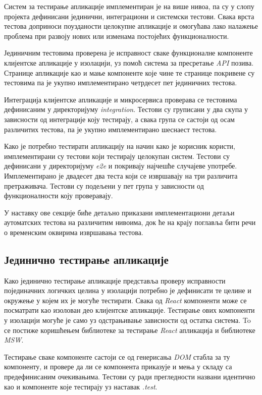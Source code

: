 \documentclass[12pt,oneside]{memoir}
\begin{document}
Систем за тестирање апликације имплементиран је на више нивоа, па су у слопу пројекта дефинисани јединични, интеграциони и системски тестови. Свака врста тестова доприноси поузданости целокупне апликације и омогућава лако налажење проблема при развоју нових или изменама постојећих функционалности.

Јединичним тестовима проверена је исправност сваке функционалне компоненте клијентске апликације у изолацији, уз помоћ система за пресретање \textit{API} позива. Странице апликације као и мање компоненте које чине те странице покривене су тестовима па је укупно имплементирано четрдесет пет јединичних тестова.

Интеграција клијентске апликације и микросервиса проверава се тестовима дефинисаним у директоријуму \textit{integration}. Тестови су груписани у два скупа у зависности од интеграције коју тестирају, а свака група се састоји од осам различитих тестова, па је укупно имплементирано шеснаест тестова.

Како је потребно тестирати апликацију на начин како је корисник користи, имплементирани су тестови који тестирају целокупан систем. Тестови су дефинисани у директоријуму \textit{e2e} и покривају најчешће случајеве употребе. Имплементирано је двадесет два теста који се извршавају на три различита претраживача.  Тестови су подељени у пет група у зависности од функционалности коју проверавају.

У наставку ове секције биће детаљно приказани имплементациони детаљи аутоматских тестова на различитим нивоима, док ће на крају поглавља бити речи о временским оквирима извршавања тестова.

\subsection{Јединично тестирање апликације}

Како јединично тестирање апликације представља проверу исправности појединачних логичких целина у изолацији потребно је дефинисати те целине и окружење у којем их је могуће тестирати. Свака од \textit{React} компоненти може се посматрати као изолован део клијентске апликације. Тестирање ових компоненти у изолацији могуће је само уз одстрањивање зависности од остатка система. To се постиже коришћењем библиотеке за тестирање \textit{React} апликација и библиотеке \textit{MSW}.

Тестирање сваке компоненте састоји се од генерисања \textit{DOM} стабла за ту компоненту, и провере да ли се компонента приказује и мења у складу са предефинисаним очекивањима. Тестови су ради прегледности названи идентично као и компоненте које тестирају уз наставак \textit{.test}. 
\end{document}
